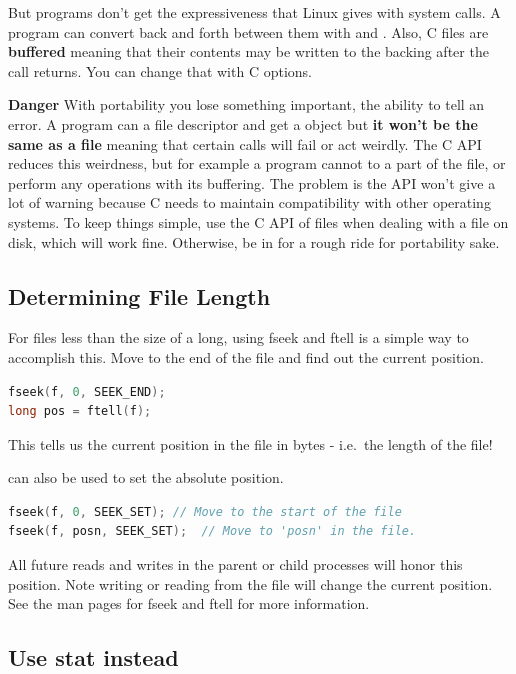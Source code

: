 But programs don't get the expressiveness that Linux gives with system calls.
A program can convert back and forth between them with  and .
Also, C files are \textbf{buffered} meaning that their contents may be written to the backing after the call returns.
You can change that with C options.

\textbf{Danger} With portability you lose something important, the ability to tell an error.
A program can  a file descriptor and get a  object but \textbf{it won't be the same as a file} meaning that certain calls will fail or act weirdly.
The C API reduces this weirdness, but for example a program cannot  to a part of the file, or perform any operations with its buffering.
The problem is the API won't give a lot of warning because C needs to maintain compatibility with other operating systems.
To keep things simple, use the C API of files when dealing with a file on disk, which will work fine. Otherwise, be in for a rough ride for portability sake.

\subsection{Determining File Length}

For files less than the size of a long, using fseek and ftell is a
simple way to accomplish this.
Move to the end of the file and find out the current position.

\begin{lstlisting}[language=C]
fseek(f, 0, SEEK_END);
long pos = ftell(f);
\end{lstlisting}

This tells us the current position in the file in bytes - i.e.~the
length of the file!

 can also be used to set the absolute position.

\begin{lstlisting}[language=C]
fseek(f, 0, SEEK_SET); // Move to the start of the file
fseek(f, posn, SEEK_SET);  // Move to 'posn' in the file.
\end{lstlisting}

All future reads and writes in the parent or child processes will honor this position.
Note writing or reading from the file will change the current position.
See the man pages for fseek and ftell for more information.

\subsection{Use stat instead}

